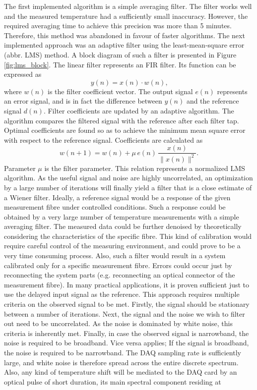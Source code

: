 \documentclass{standalone}
\begin{document}
The first implemented algorithm is a simple averaging filter. The filter works well and the measured temperature had a sufficiently small inaccuracy. However, the required averaging time to achieve this precision was more than 5 minutes. Therefore, this method was abandoned in favour of faster algorithms. The next implemented approach was an adaptive filter using the least-mean-square error (abbr. LMS) method. A block diagram of such a filter is presented in Figure \ref{fig:lms_block}.
The linear filter represents an FIR filter. Its function can be expressed as
\begin{equation}
y(n) = x(n) \cdot w(n) \textrm{,}
\end{equation}
where $w(n)$ is the filter coefficient vector. The output signal $e(n)$ represents an error signal, and is in fact the difference between $y(n)$ and the reference signal $d(n)$. Filter coefficients are updated by an adaptive algorithm. The algorithm compares the filtered signal with the reference after each filter tap. Optimal coefficients are found so as to achieve the minimum mean square error with respect to the reference signal. Coefficients are calculated as
\begin{equation}
w(n+1) = w(n) + \mu \, e(n) \, \frac{x(n)}{\| x(n) \| ^2} \textrm{.}
\end{equation}
Parameter $\mu$ is the filter parameter. This relation represents a normalized LMS algorithm. As the useful signal and noise are highly uncorrelated, an optimization by a large number of iterations will finally yield a filter that is a close estimate of a Wiener filter. Ideally, a reference signal would be a response of the given measurement fibre under controlled conditions. Such a response could be obtained by a very large number of temperature measurements with a simple averaging filter. The measured data could be further denoised by theoretically considering the characteristics of the specific fibre. This kind of calibration would require careful control of the measuring environment, and could prove to be a very time consuming process. Also, such a filter would result in a system calibrated only for a specific measurement fibre. Errors could occur just by reconnecting the system parts (e.g. reconnecting an optical connector of the measurement fibre). In many practical applications, it is proven sufficient just to use the delayed input signal as the reference. This approach requires multiple criteria on the observed signal to be met. Firstly, the signal should be stationary between a number of iterations. Next, the signal and the noise we wish to filter out need to be uncorrelated. As the noise is dominated by white noise, this criteria is inherently met. Finally, in case the observed signal is narrowband, the noise is required to be broadband. Vice versa applies; If the signal is broadband, the noise is required to be narrowband. The DAQ sampling rate is sufficiently large, and white noise is therefore spread across the entire discrete spectrum. Also, any kind of temperature shift will be mediated to the DAQ card by an optical pulse of short duration, its main spectral component residing at
\end{document}
